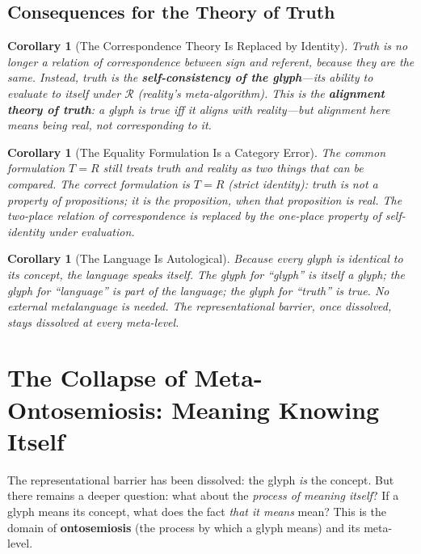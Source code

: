 \documentclass[12pt, letterpaper]{book}
\def\equiv{=}%
\newtheorem{corollary}[theorem]{Corollary}
\begin{document}
\subsection{Consequences for the Theory of Truth}

\begin{corollary}[The Correspondence Theory Is Replaced by Identity]\label{cor:alignment}
Truth is no longer a relation of \textit{correspondence} between sign and referent, because they are the same. Instead, truth is the \textbf{self-consistency of the glyph}---its ability to evaluate to itself under $\mathcal{R}$ (reality's meta-algorithm). This is the \textbf{alignment theory of truth}: a glyph is true iff it aligns with reality---but alignment here means \textit{being} real, not corresponding to it.
\end{corollary}

\begin{corollary}[The Equality Formulation Is a Category Error]\label{cor:category}
The common formulation $T = R$ still treats truth and reality as two things that can be compared. The correct formulation is $T \equiv R$ (strict identity): truth is not a property \textit{of} propositions; it \textit{is} the proposition, when that proposition is real. The two-place relation of correspondence is replaced by the one-place property of self-identity under evaluation.
\end{corollary}

\begin{corollary}[The Language Is Autological]\label{cor:autological}
Because every glyph is identical to its concept, the language speaks itself. The glyph for ``glyph'' is itself a glyph; the glyph for ``language'' is part of the language; the glyph for ``truth'' is true. No external metalanguage is needed. The representational barrier, once dissolved, stays dissolved at every meta-level.
\end{corollary}

\section{The Collapse of Meta-Ontosemiosis: Meaning Knowing Itself}

The representational barrier has been dissolved: the glyph \textit{is} the concept. But there remains a deeper question: what about the \textit{process of meaning itself}? If a glyph means its concept, what does the fact \textit{that it means} mean? This is the domain of \textbf{ontosemiosis} (the process by which a glyph means) and its meta-level.
\end{document}
